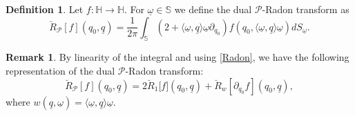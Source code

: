 \documentclass[reqno,11pt]{amsart}
\numberwithin{equation}{section}
\theoremstyle{definition}
\newtheorem{remark}[theorem]{{\bf Remark}}
\newtheorem{definition}[theorem]{Definition}
\begin{document}
\begin{definition}
\label{pradon}
Let $f: \mathbb{H} \to \mathbb{H}$. For $\underline{\omega} \in \mathbb{S}$ we define the dual $\mathcal{P}$-Radon transform as
\begin{equation}
\label{Pradon}
	\breve{R}_{\mathcal{P}}[f](q_0, \underline{q})= \frac{1}{2 \pi} \int_{\mathbb{S}} (2+ \langle \underline{\omega}, \underline{q} \rangle \underline{\omega} \partial_{q_0})f(q_0, \langle \underline{\omega}, \underline{q} \rangle \underline{\omega})  dS_{\underline{\omega}}.
\end{equation}

\end{definition}


\begin{remark}
By linearity of the integral and using \eqref{Radon}, we have the following representation of the dual $\mathcal{P}$-Radon transform:
$$\breve{R}_{\mathcal{P}}[f](q_0,\underline{q})=2
\breve{R}_1\big[f\big](q_0,\underline{q})+\breve{R}_w\!\left[\partial_{q_0} f\right](q_0,\underline{q}),$$
where $w(\underline{q}, \underline{\omega})=\langle \underline{\omega}, \underline{q} \rangle \underline{\omega}$.
\end{remark}
\end{document}
